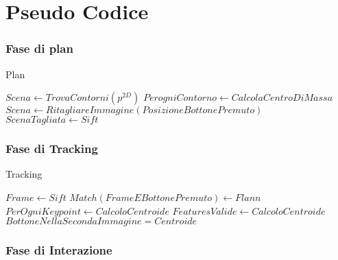 
\chapter{Pseudo Codice}
\subsection{Fase di plan}

\begin{algorithm}
  \caption{Plan}\label{alg:Plan}
  \begin{algorithmic}[1]
    \State $Scena \gets TrovaContorni(p^{2D})$
    \State $PerogniContorno \gets CalcolaCentroDiMassa$
       
      	\State $Scena \gets RitagliareImmagine(Posizione Bottone Premuto)$
            \State $ScenaTagliata \gets Sift$
      \Else 
    \EndIf
  \end{algorithmic}
\end{algorithm}


\subsection{Fase di Tracking}

\begin{algorithm}
  \caption{Tracking}\label{alg:Tracking}
  \begin{algorithmic}[1]
    \State $Frame \gets Sift$
    \State $Match(FrameEBottonePremuto ) \gets Flann$
    \State $PerOgniKeypoint \gets CalcoloCentroide$
       
      	\State $FeaturesValide \gets CalcoloCentroide $
      	\State $BottoneNellaSecondaImmagine  = Centroide $
      \Else 
    \EndIf
  \end{algorithmic}
\end{algorithm}


\subsection{Fase di Interazione}


